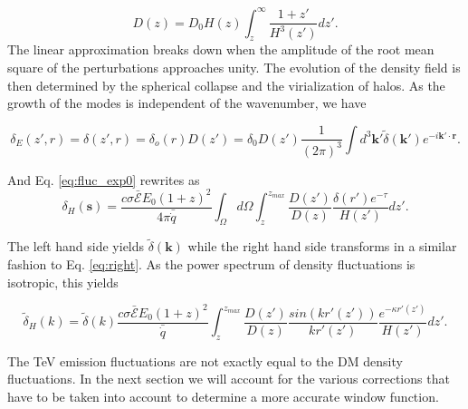 \documentclass[onecolumn]{emulateapj}
\begin{document}
\begin{equation}
  \label{eq:growth_1}
  D(z)=D_0H(z)\int_z^{\infty}\frac{1+z'}{H^3(z')}dz'.
\end{equation}
The linear approximation breaks down when the amplitude of the root mean square of the perturbations approaches unity. The evolution of the density field is then determined by the spherical collapse \citep{1972ApJ...176....1G} and the virialization of halos. As the growth of the modes is independent of the wavenumber, we have

\begin{equation}
  \label{eq:FT_delta}
  \delta_E(z',r)=\delta(z',r)=\delta_o(r)D(z')=\delta_0D(z')\frac{1}{(2\pi)^3}\int d^3\mathbf{k'} \tilde{\delta}(\mathbf{k'}) e^{-i\mathbf{k'}\cdot\mathbf{r}}.
\end{equation}


And Eq. \ref{eq:fluc_exp0}  rewrites as
\begin{equation}
  \label{eq:heat_fluc_exp0}
  \delta_H(\mathbf{s})=\frac{c\sigma\bar{\mathcal{E}} E_0(1+z)^2 }{4\pi\bar{\dot{q}}} \int_{\Omega}d\Omega\int_z^{z_{max}}  \frac{D(z')}{D(z)} \frac{\delta(r') e^{-\tau}}{H(z')}dz'.
\end{equation}


The left hand side yields $\tilde{\delta}(\mathbf{k})$ while the right hand side transforms in a similar fashion to Eq. \ref{eq:right}. As the power spectrum of density fluctuations is isotropic, this  yields

\begin{equation}
  \label{eq:heat_fluc_exp1}
  \tilde{\delta}_H(k)=\tilde{\delta}(k) \frac{c \sigma \bar{\mathcal{E}}E_0(1+z)^2}{\bar{\dot{q}}} \int_z^{z_{max}} \frac{D(z')}{D(z)}\frac{sin(kr'(z'))}{kr'(z')}    \frac{e^{-\kappa r'(z')}} {H(z')}  dz'.
\end{equation}


The TeV emission fluctuations are not exactly equal to the DM density fluctuations. In the next section we will account for the various corrections that have to be taken into account to determine a more accurate window function.
\end{document}
